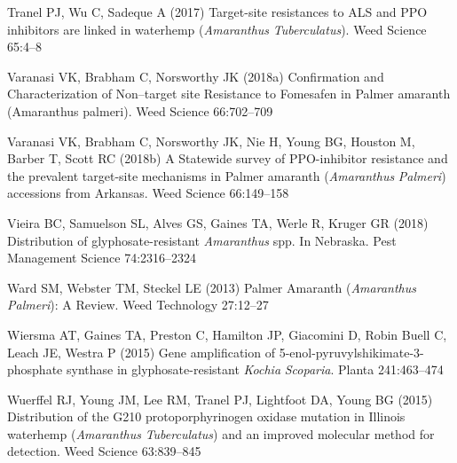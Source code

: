 \documentclass[
  12pt,
  a4paper]{article}
\begin{document}
\leavevmode\hypertarget{ref-tranel_target-site_2017}{}%
Tranel PJ, Wu C, Sadeque A (2017) Target-site resistances to ALS and PPO
inhibitors are linked in waterhemp (\emph{Amaranthus}
\emph{Tuberculatus}). Weed Science 65:4--8

\leavevmode\hypertarget{ref-varanasi_confirmation_2018}{}%
Varanasi VK, Brabham C, Norsworthy JK (2018a) Confirmation and
Characterization of Non--target site Resistance to Fomesafen in Palmer
amaranth (Amaranthus palmeri). Weed Science 66:702--709

\leavevmode\hypertarget{ref-varanasi_statewide_2018}{}%
Varanasi VK, Brabham C, Norsworthy JK, Nie H, Young BG, Houston M,
Barber T, Scott RC (2018b) A Statewide survey of PPO-inhibitor
resistance and the prevalent target-site mechanisms in Palmer amaranth
(\emph{Amaranthus} \emph{Palmeri}) accessions from Arkansas. Weed
Science 66:149--158

\leavevmode\hypertarget{ref-vieira_distribution_2018}{}%
Vieira BC, Samuelson SL, Alves GS, Gaines TA, Werle R, Kruger GR (2018)
Distribution of glyphosate-resistant \emph{Amaranthus} spp. In Nebraska.
Pest Management Science 74:2316--2324

\leavevmode\hypertarget{ref-ward_palmer_2013}{}%
Ward SM, Webster TM, Steckel LE (2013) Palmer Amaranth
(\emph{Amaranthus} \emph{Palmeri}): A Review. Weed Technology 27:12--27

\leavevmode\hypertarget{ref-wiersma_gene_2015}{}%
Wiersma AT, Gaines TA, Preston C, Hamilton JP, Giacomini D, Robin Buell
C, Leach JE, Westra P (2015) Gene amplification of
5-enol-pyruvylshikimate-3-phosphate synthase in glyphosate-resistant
\emph{Kochia} \emph{Scoparia}. Planta 241:463--474

\leavevmode\hypertarget{ref-wuerffel_distribution_2015}{}%
Wuerffel RJ, Young JM, Lee RM, Tranel PJ, Lightfoot DA, Young BG (2015)
Distribution of the G210 protoporphyrinogen oxidase mutation in Illinois
waterhemp (\emph{Amaranthus} \emph{Tuberculatus}) and an improved
molecular method for detection. Weed Science 63:839--845
\end{document}
